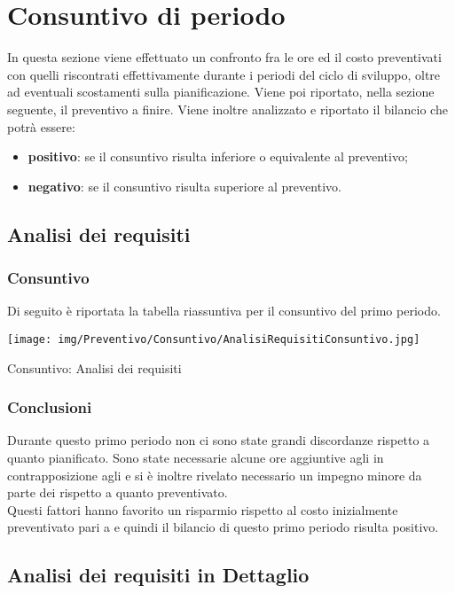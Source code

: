 \newpage
\section{Consuntivo di periodo} \label{ConsuntivoPeriodo}

In questa sezione viene effettuato un confronto fra le ore ed il costo preventivati con quelli riscontrati effettivamente durante i periodi del ciclo di sviluppo, oltre ad eventuali scostamenti sulla pianificazione. Viene poi riportato, nella sezione seguente, il preventivo a finire.
Viene inoltre analizzato e riportato il bilancio che potrà essere:
\begin{itemize}
	\item \textbf{positivo}: se il consuntivo risulta inferiore o equivalente al preventivo;
	\item \textbf{negativo}: se il consuntivo risulta superiore al preventivo.
\end{itemize}

\subsection{Analisi dei requisiti}
\subsubsection{Consuntivo}
Di seguito è riportata la tabella riassuntiva per il consuntivo del primo periodo.
\begin{table}[h!]
	\centerline{\texttt{[image: img/Preventivo/Consuntivo/AnalisiRequisitiConsuntivo.jpg]}}
	\caption{Consuntivo: Analisi dei requisiti}
\end{table}

\subsubsection{Conclusioni}
Durante questo primo periodo non ci sono state grandi discordanze rispetto a quanto pianificato. Sono state necessarie alcune ore aggiuntive agli \adms{} in contrapposizione agli \anas{} e si è inoltre rivelato necessario un impegno minore da parte dei \vers{} rispetto a quanto preventivato.\\
Questi fattori hanno favorito un risparmio rispetto al costo inizialmente preventivato pari a  e quindi il bilancio di questo primo periodo risulta positivo.

\subsection{Analisi dei requisiti in Dettaglio}
